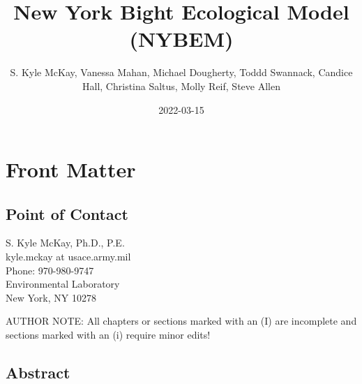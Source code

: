 \documentclass[
]{book}
\title{New York Bight Ecological Model (NYBEM)}
\author{S. Kyle McKay, Vanessa Mahan, Michael Dougherty, Toddd Swannack, Candice Hall, Christina Saltus, Molly Reif, Steve Allen}
\date{2022-03-15}
\begin{document}
\maketitle

{
\setcounter{tocdepth}{1}
\tableofcontents
}
\hypertarget{front-matter}{%
\chapter*{Front Matter}\label{front-matter}}

\hypertarget{point-of-contact}{%
\section*{Point of Contact}\label{point-of-contact}}

S. Kyle McKay, Ph.D., P.E.\\
kyle.mckay at usace.army.mil\\
Phone: 970-980-9747\\
Environmental Laboratory\\
New York, NY 10278

{AUTHOR NOTE: All chapters or sections marked with an (I) are incomplete and sections marked with an (i) require minor edits!}

\hypertarget{abstract}{%
\section*{Abstract}\label{abstract}}
\end{document}
